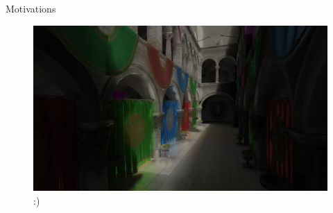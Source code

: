 \documentclass[10pt]{beamer}
\begin{document}
\begin{frame}{Motivations}
  \begin{figure}
    \includegraphics[width=\textwidth]{gi_on.png}
    \caption*{:)}
  \end{figure}
\end{frame}


\end{document}
